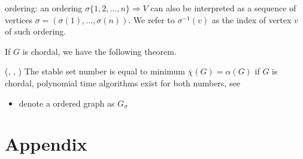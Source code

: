 ordering: an ordering \(\sigma \{1, 2, ... , n\} \Rightarrow V\) can
also be interpreted as a sequence of vertices
\(\sigma = (\sigma(1), ... , \sigma(n))\). We refer to
\(\sigma^{−1} (v)\) as the index of vertex \(v\) of such ordering.

If \(G\) is chordal, we have the following theorem.

\begin{theorem}
      (\cite{gavril_algorithms_1972}, \cite{schrijver_combinatorial_2003}, \cite{vandenberghe_chordal_2015})
      The stable set number is equal to minimum  \(\bar \chi (G) = \alpha(G)\) if \(G\) is chordal,
      polynomial time algorithms exist for both numbers, see \cite{gavril_algorithms_1972}
\end{theorem}


\begin{itemize}
      \tightlist
      \item
            denote a ordered graph as \(G_\sigma\)
\end{itemize}





\section*{Appendix}\label{sec:appendix}

